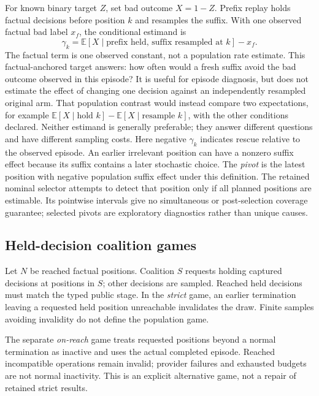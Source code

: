 \documentclass[conference]{IEEEtran}
\begin{document}
For known binary target $Z$, set bad outcome $X=1-Z$. Prefix replay holds
factual decisions before position $k$ and resamples the suffix. With one
observed factual bad label $x_f$, the conditional estimand is
\begin{equation}
\gamma_k = \mathbb{E}[X\mid \text{prefix held, suffix resampled at }k]-x_f.
\end{equation}
The factual term is one observed constant, not a population rate estimate.
This factual-anchored target answers: how often would a fresh suffix avoid the
bad outcome observed in this episode? It is useful for episode diagnosis, but
does not estimate the effect of changing one decision against an independently
resampled original arm. That population contrast would instead compare two
expectations, for example $\mathbb{E}[X\mid\text{hold }k]-
\mathbb{E}[X\mid\text{resample }k]$, with the other conditions declared.
Neither estimand is generally preferable; they answer different questions and
have different sampling costs. Here negative $\gamma_k$ indicates rescue
relative to the observed episode. An earlier irrelevant position can have a
nonzero suffix effect because its suffix contains a later stochastic choice.
The \emph{pivot} is the latest position with negative population suffix effect
under this definition. The retained nominal selector attempts to detect that
position only if all planned positions are estimable. Its pointwise intervals
give no simultaneous or post-selection coverage guarantee; selected pivots are
exploratory diagnostics rather than unique causes.

\subsection{Held-decision coalition games}
Let $N$ be reached factual positions. Coalition $S$ requests holding captured
decisions at positions in $S$; other decisions are sampled. Reached held
decisions must match the typed public stage. In the \emph{strict} game, an
earlier termination leaving a requested held position unreachable invalidates
the draw. Finite samples avoiding invalidity do not define the population game.

The separate \emph{on-reach} game treats requested positions beyond a normal
termination as inactive and uses the actual completed episode. Reached
incompatible operations remain invalid; provider failures and exhausted budgets
are not normal inactivity. This is an explicit alternative game, not a repair
of retained strict results.
\end{document}
